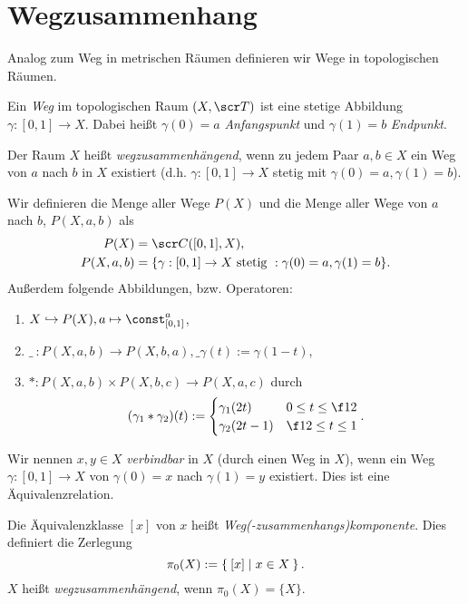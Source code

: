 \section{Wegzusammenhang}

Analog zum Weg in metrischen Räumen definieren wir Wege in topologischen Räumen.

\begin{df}
	Ein \emph{Weg} im topologischen Raum $(X, \scr T)$ ist eine stetige Abbildung $\gamma: [0,1] \to X$.
	Dabei heißt $\gamma(0) = a$ \emph{Anfangspunkt} und $\gamma(1) = b$ \emph{Endpunkt}.

	Der Raum $X$ heißt \emph{wegzusammenhängend}, wenn zu jedem Paar $a,b \in X$ ein Weg von $a$ nach $b$ in $X$ existiert (d.h. $\gamma:[0,1] \to X$ stetig mit $\gamma(0) = a, \gamma(1) = b$).

	Wir definieren die Menge aller Wege $P(X)$ und die Menge aller Wege von $a$ nach $b$, $P(X, a, b)$ als
	\begin{align*}
		P(X) &= \scr C ([0,1], X), \\
		P(X, a, b) &= \{ \gamma : [0,1] \to X \text{ stetig } : \gamma(0) = a, \gamma(1) = b \}.
	\end{align*}
	Außerdem folgende Abbildungen, bzw. Operatoren:
	\begin{enumerate}[1)]
		\item
			$X \injto P(X), a \mapsto \const_{[0,1]}^a$,
		\item
			$\_\  : P(X, a, b) \to P(X, b, a), \_\gamma(t) := \gamma(1-t)$,
		\item
			$\ast: P(X, a, b) \times P(X, b, c) \to P(X, a, c)$ durch
			\[
				(\gamma_1 \ast \gamma_2)(t) := \begin{cases}
					\gamma_1 (2t) & 0 \le t \le \f 12 \\
					\gamma_2 (2t - 1) & \f 12 \le t \le 1
				\end{cases}.
			\]
	\end{enumerate}
\end{df}

\begin{df}
	Wir nennen $x,y \in X$ \emph{verbindbar} in $X$ (durch einen Weg in $X$), wenn ein Weg $\gamma: [0,1] \to X$ von $\gamma(0) = x$ nach $\gamma(1) = y$ existiert.
	Dies ist eine Äquivalenzrelation.

	Die Äquivalenzklasse $[x]$ von $x$ heißt \emph{Weg(-zusammenhangs)komponente}.
	Dies definiert die Zerlegung
	\[
		\pi_0 (X) := \Set{ [x] | x \in X }.
	\]
	$X$ heißt \emph{wegzusammenhängend}, wenn $\pi_0(X) = \{X\}$.
\end{df}

